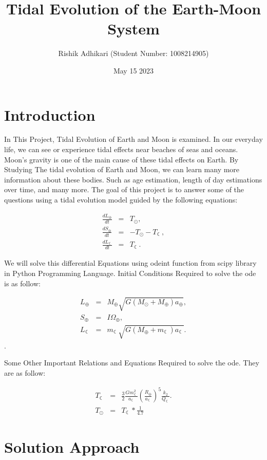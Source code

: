 \documentclass[12pt, letterpaper]{article}
\title{Tidal Evolution of the Earth-Moon System}
\author{Rishik Adhikari (Student Number: 1008214905) }
\date{May 15 2023}
\begin{document}
\maketitle

\section*{Introduction}

In This Project, Tidal Evolution of Earth and Moon is examined. In our everyday life, we can see or experience tidal effects near beaches of seas and oceans. Moon's gravity is one of the main cause of these tidal effects on Earth. By Studying The tidal evolution of Earth and Moon, we can learn many more information about these bodies. Such as age estimation, length of day estimations over time, and many more. The goal of this project is to answer some of the questions using a tidal evolution model guided by the following equations:

    \begin{eqnarray}
        \frac{dL_\oplus}{dt} &=& T_\odot,\\
        \frac{dS_\oplus}{dt} &=& -T_\odot-T_{\leftmoon},\\
        \frac{dL_{\leftmoon}}{dt} &=& T_{\leftmoon}.
    \end{eqnarray}

We will solve this differential Equations using odeint function from scipy library in Python Programming Language. Initial Conditions Required to solve the ode is as follow:

\begin{eqnarray}
L_\oplus &=& M_\oplus\sqrt{G(M_\odot + M_\oplus) a_\oplus},\\
S_\oplus &=& I\Omega_\oplus,\\
L_{\leftmoon} &=& m_{\leftmoon}\sqrt{G(M_\oplus+m_{\leftmoon}) a_{\leftmoon}}.
\end{eqnarray}.

Some Other Important Relations and Equations Required to solve the ode. They are as follow:

\begin{eqnarray}
  T_{\leftmoon} &=& \frac{3}{2}\frac{G m^2_{\leftmoon}}{a_{\leftmoon}}\left(\frac{R_\oplus}{a_{\leftmoon}}\right)^5 \frac{k_2}{Q_{\leftmoon}}. \\
  T_{\odot} &=& T_{\leftmoon}*\frac{1}{4.7}
\end{eqnarray}

\section*{Solution Approach}
\end{document}
